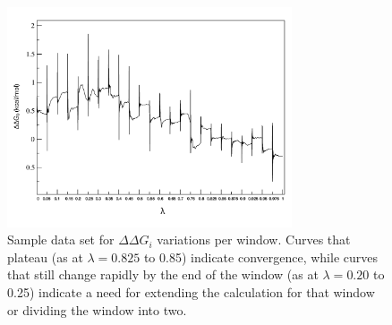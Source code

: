 \documentclass[12pt]{article}
\begin{document}
\begin{figure}
\begin{center}
\centering
\includegraphics[width =  0.75\textwidth]{finlpics/per_lambda}
\caption{Sample data set for $\Delta\Delta G_{i}$ variations per window.%
Curves that plateau (as at $\lambda = 0.825$ to 0.85) indicate convergence, while curves that still change rapidly by the end of the window (as at $\lambda = 0.20$ to 0.25) indicate a need for extending the calculation for that window or dividing the window into two.  }
\label{fig:lambda}
\end{center}
\end{figure}
\end{document}
